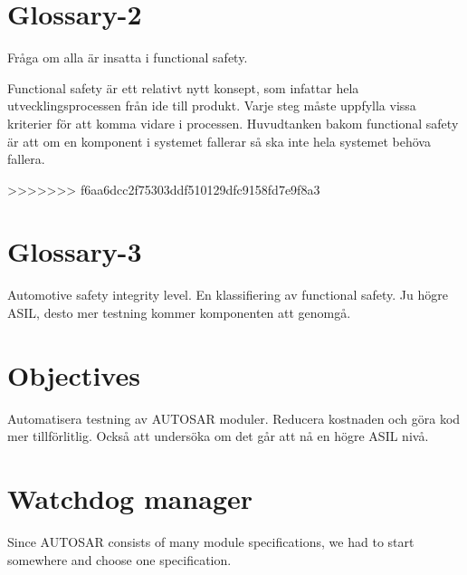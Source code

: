 \documentclass[a4paper]{article}
\begin{document}
\section{Glossary-2}
Fråga om alla är insatta i functional safety.

Functional safety är ett relativt nytt konsept, som infattar hela
utvecklingsprocessen från ide till produkt. Varje steg måste uppfylla
vissa kriterier för att komma vidare i processen.
Huvudtanken bakom functional safety är att om en komponent i systemet
fallerar så ska inte hela systemet behöva fallera.


>>>>>>> f6aa6dcc2f75303ddf510129dfc9158fd7e9f8a3




\section{Glossary-3}
Automotive safety integrity level. En klassifiering av functional safety.
Ju högre ASIL, desto mer testning kommer komponenten att genomgå.


\section{Objectives}
Automatisera testning av AUTOSAR moduler. Reducera kostnaden och göra
kod mer tillförlitlig. Också att undersöka om det går att nå en högre
ASIL nivå.



\section{Watchdog manager}
Since AUTOSAR consists of many module specifications, we had to start
somewhere and choose one specification.
\end{document}
